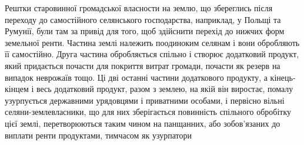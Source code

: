 Рештки старовинної громадської власности на землю, що збереглись після
переходу до самостійного селянського господарства, наприклад, у Польщі та
Румунії, були там за привід для того, щоб здійснити перехід до нижчих форм
земельної ренти. Частина землі належить поодиноким селянам і вони обробляють
її самостійно. Друга частина обробляється спільно і створює додатковий
продукт, який придається почасти для покриття витрат громади, почасти як
резерв на випадок неврожаїв тощо. Ці дві останні частини додаткового продукту,
а кінець-кінцем і весь додатковий продукт, разом з землею, на якій він виростає,
помалу узурпується державними урядовцями і приватними особами,
і первісно вільні селяни-землевласники, що для них зберігається повинність
спільного обробітку цієї землі, перетворюються таким чином на панщанних,
або зобов’язаних до виплати ренти продуктами, тимчасом як узурпатори
\parbreak{}  %

